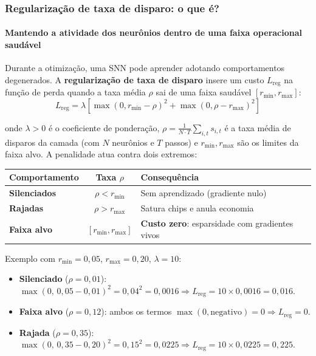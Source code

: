 \begin{frame}[shrink]
	\frametitle{Regularização de taxa de disparo: o que é?}
	\framesubtitle{Mantendo a atividade dos neurônios dentro de uma faixa operacional saudável}
	\small
	\par Durante a otimização, uma SNN pode aprender adotando comportamentos degenerados. A \textbf{regularização de taxa de disparo} insere um custo $L_{\mathrm{reg}}$ na função de perda quando a taxa média $\rho$ sai de uma faixa saudável $[r_{\min}, r_{\max}]$:
	\[
		L_{\mathrm{reg}} = \lambda \left[ \max(0, r_{\min} - \rho)^2 + \max(0, \rho - r_{\max})^2 \right]
	\]
	\par onde $\lambda > 0$ é o coeficiente de ponderação, $\rho = \frac{1}{N \cdot T}\sum_{i,t} s_{i,t}$ é a taxa média de disparos da camada (com $N$ neurônios e $T$ passos) e $r_{\min}, r_{\max}$ são os limites da faixa alvo. A penalidade atua contra dois extremos:
	\begin{center}
		\footnotesize
		\begin{tabular}{lcl}
			\toprule
			\textbf{Comportamento} & \textbf{Taxa $\rho$} & \textbf{Consequência} \\
			\midrule
			\textbf{Silenciados} & $\rho < r_{\min}$ & Sem aprendizado (gradiente nulo) \\
			\textbf{Rajadas} & $\rho > r_{\max}$ & Satura chips e anula economia \\
			\textbf{Faixa alvo} & $[r_{\min}, r_{\max}]$ & \textbf{Custo zero}: esparsidade com gradientes vivos \\
			\bottomrule
		\end{tabular}
	\end{center}
	\par Exemplo com $r_{\min}=0{,}05$, $r_{\max}=0{,}20$, $\lambda=10$:
	\begin{itemize}
		\setlength{\itemsep}{1pt}
		\item \textbf{Silenciado} ($\rho=0{,}01$): $\max(0,\,0{,}05-0{,}01)^2 = 0{,}04^2 = 0{,}0016 \Rightarrow L_{\mathrm{reg}} = 10 \times 0{,}0016 = 0{,}016$.
		\item \textbf{Faixa alvo} ($\rho=0{,}12$): ambos os termos $\max(0,\text{negativo})=0 \Rightarrow L_{\mathrm{reg}} = 0$.
		\item \textbf{Rajada} ($\rho=0{,}35$): $\max(0,\,0{,}35-0{,}20)^2 = 0{,}15^2 = 0{,}0225 \Rightarrow L_{\mathrm{reg}} = 10 \times 0{,}0225 = 0{,}225$.
	\end{itemize}
\end{frame}

